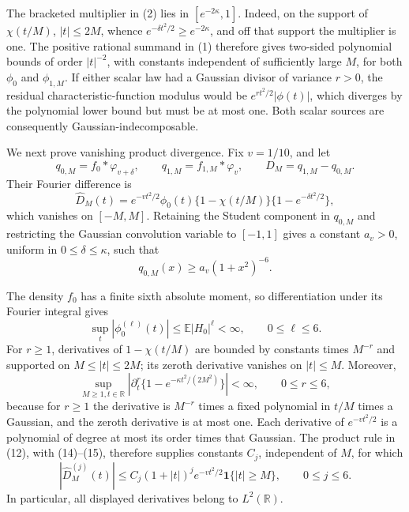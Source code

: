 The bracketed multiplier in (2) lies in \([e^{-2\kappa},1]\).  Indeed, on the support of \(\chi(t/M)\), \(|t|\le2M\), whence \(e^{-\delta t^2/2}\ge e^{-2\kappa}\), and off that support the multiplier is one.  The positive rational summand in (1) therefore gives two-sided polynomial bounds of order \(|t|^{-2}\), with constants independent of sufficiently large \(M\), for both \(\phi_0\) and \(\phi_{1,M}\).  If either scalar law had a Gaussian divisor of variance \(r>0\), the residual characteristic-function modulus would be \(e^{rt^2/2}|\phi(t)|\), which diverges by the polynomial lower bound but must be at most one.  Both scalar sources are consequently Gaussian-indecomposable.

We next prove vanishing product divergence.  Fix \(v=1/10\), and let
\[
 q_{0,M}=f_0*\varphi_{v+\delta},\qquad
 q_{1,M}=f_{1,M}*\varphi_v,
 \qquad D_M=q_{1,M}-q_{0,M}.
\]
Their Fourier difference is
\[
 \widehat D_M(t)=e^{-vt^2/2}\phi_0(t)
 \{1-\chi(t/M)\}\{1-e^{-\delta t^2/2}\}, \tag{12}
\]
which vanishes on \([-M,M]\).  Retaining the Student component in \(q_{0,M}\) and restricting the Gaussian convolution variable to \([-1,1]\) gives a constant \(a_v>0\), uniform in \(0\le\delta\le\kappa\), such that
\[
 q_{0,M}(x)\ge a_v(1+x^2)^{-6}. \tag{13}
\]

The density \(f_0\) has a finite sixth absolute moment, so differentiation under its Fourier integral gives
\[
 \sup_t|\phi_0^{(\ell)}(t)|
 \le\mathbb E|H_0|^\ell<\infty,
 \qquad0\le\ell\le6. \tag{14}
\]
For \(r\ge1\), derivatives of \(1-\chi(t/M)\) are bounded by constants times \(M^{-r}\) and supported on \(M\le|t|\le2M\); its zeroth derivative vanishes on \(|t|\le M\).  Moreover,
\[
 \sup_{M\ge1,t\in\mathbb R}
 \left|\partial_t^r\{1-e^{-\kappa t^2/(2M^2)}\}\right|<\infty,
 \qquad0\le r\le6, \tag{15}
\]
because for \(r\ge1\) the derivative is \(M^{-r}\) times a fixed polynomial in \(t/M\) times a Gaussian, and the zeroth derivative is at most one.  Each derivative of \(e^{-vt^2/2}\) is a polynomial of degree at most its order times that Gaussian.  The product rule in (12), with (14)--(15), therefore supplies constants \(C_j\), independent of \(M\), for which
\[
 |\widehat D_M^{(j)}(t)|
 \le C_j(1+|t|)^je^{-vt^2/2}\mathbf 1\{|t|\ge M\},
 \qquad0\le j\le6. \tag{16}
\]
In particular, all displayed derivatives belong to \(L^2(\mathbb R)\).

